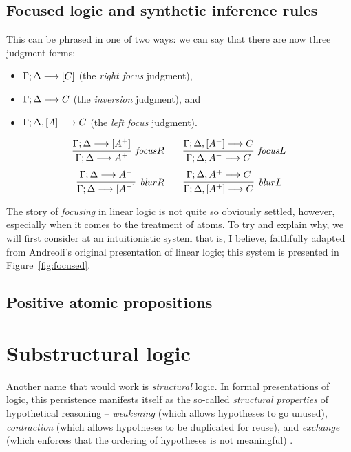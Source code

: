 \section{Focused logic and synthetic inference rules}


 This can be phrased
in one of two ways: we can say that there are now three judgment
forms:
\begin{itemize}
\item ${\Gamma};{\Delta} \longrightarrow [{C}] \mathstrut$ (the {\it right focus} judgment),
\item ${\Gamma};{\Delta} \longrightarrow {C} \mathstrut$ (the {\it inversion} judgment), and
\item ${\Gamma};{\Delta}, [{A}] \longrightarrow {C} \mathstrut$ (the {\it left focus} judgment).
\end{itemize}

\[
\infer[{\it focus}R]
{\seq{\Gamma}{\Delta}{A^+}}
{\seq{\Gamma}{\Delta}{[A^+]}}
\qquad
\infer[{\it focus}L]
{\seq{\Gamma}{\Delta,A^-}{C}}
{\seq{\Gamma}{\Delta,[A^-]}{C}}
\]\[
\infer[{\it blur}R]
{\seq{\Gamma}{\Delta}{[A^-]}}
{\seq{\Gamma}{\Delta}{A^-}}
\qquad
\infer[{\it blur}L]
{\seq{\Gamma}{\Delta, [A^+]}{C}}
{\seq{\Gamma}{\Delta, A^+}{C}}
\]


The story of {\it focusing} in linear logic is not quite so 
obviously settled, however, especially when it comes to the treatment
of atoms. To try and explain why, we will first consider at 
an intuitionistic system that is, I believe, faithfully adapted from 
Andreoli's original presentation of linear logic; this system is
presented in Figure~\ref{fig:focused}.

\section{Positive atomic propositions}

\chapter{Substructural logic}

Another name that would work
is {\it structural} logic. In formal presentations of logic, this
persistence manifests itself as the so-called {\it structural
  properties} of hypothetical reasoning -- {\it weakening} (which
allows hypotheses to go unused), {\it contraction} (which allows
hypotheses to be duplicated for reuse), and {\it exchange} (which
enforces that the ordering of hypotheses is not meaningful)
\cite{gentzen35untersuchungen}.
